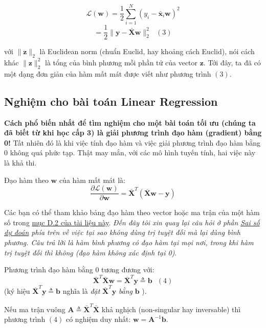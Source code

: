 $$ 
\mathcal{L}(\mathbf{w})  
= \frac{1}{2}\sum_{i=1}^N (y_i - \mathbf{\bar{x}}_i\mathbf{w})^2 $$ 
$$ 
= \frac{1}{2} \|\mathbf{y} - \mathbf{\bar{X}}\mathbf{w} \|_2^2  
~~~(3) 
$$ 
 
với $ \| \mathbf{z} \|_2 $ là Euclidean norm (chuẩn Euclid, hay khoảng cách Euclid), nói cách khác $ \| \mathbf{z} \|_2^2 $ là tổng của bình phương mỗi phần tử của vector $\mathbf{z}$. Tới đây, ta đã có một dạng đơn giản của hàm mất mát được viết như phương trình $(3)$. 
 
 
 
 
 
\subsection{Nghiệm cho bài toán Linear Regression}
 
\textbf{Cách phổ biến nhất để tìm nghiệm cho một bài toán tối ưu (chúng ta đã biết từ khi học cấp 3) là giải phương trình đạo hàm (gradient) bằng 0!} Tất nhiên đó là khi việc tính đạo hàm và việc giải phương trình đạo hàm bằng 0 không quá phức tạp. Thật may mắn, với các mô hình tuyến tính, hai việc này là khả thi.  
 
Đạo hàm theo $\mathbf{w} $ của hàm mất mát là:  
$$ 
\frac{\partial{\mathcal{L}(\mathbf{w})}}{\partial{\mathbf{w}}}  
= \mathbf{\bar{X}}^T(\mathbf{\bar{X}}\mathbf{w} - \mathbf{y})  
$$ 
 
Các bạn có thể tham khảo bảng đạo hàm theo vector hoặc ma trận của một hàm số trong \href{https://ccrma.stanford.edu/~dattorro/matrixcalc.pdf}{mục D.2 của tài liệu này}. \textit{Đến đây tôi xin quay lại câu hỏi ở phần \href{sai so du doan}{Sai số dự đoán} phía trên về việc tại sao không dùng trị tuyệt đối mà lại dùng bình phương. Câu trả lời là hàm bình phương có đạo hàm tại mọi nơi, trong khi hàm trị tuyệt đối thì không (đạo hàm không xác định tại 0)}. 
 
Phương trình đạo hàm bằng 0 tương đương với:  
$$ 
\mathbf{\bar{X}}^T\mathbf{\bar{X}}\mathbf{w} = \mathbf{\bar{X}}^T\mathbf{y} \triangleq \mathbf{b}  
~~~ (4) 
$$ 
(ký hiệu $\mathbf{\bar{X}}^T\mathbf{y} \triangleq \mathbf{b} $ nghĩa là \textit{đặt} $\mathbf{\bar{X}}^T\mathbf{y}$ \textit{bằng} $\mathbf{b}$ ). 
 
Nếu ma trận vuông $ \mathbf{A} \triangleq \mathbf{\bar{X}}^T\mathbf{\bar{X}}$ khả nghịch (non-singular hay inversable) thì phương trình $(4)$ có nghiệm duy nhất: $ \mathbf{w} = \mathbf{A}^{-1}\mathbf{b}  $. 
 
